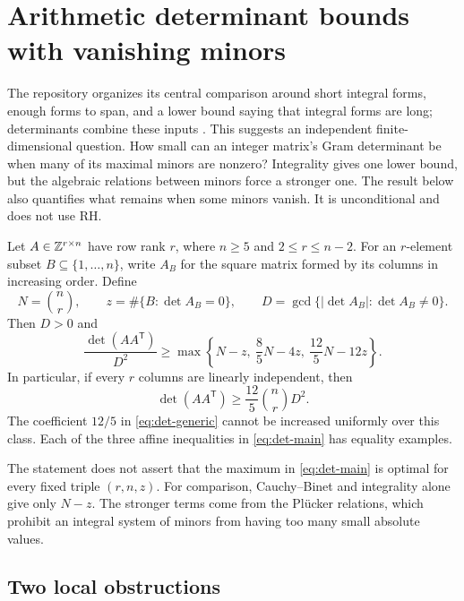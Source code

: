\section{Arithmetic determinant bounds with vanishing minors}
\label{sec:determinants}

The repository organizes its central comparison around short integral
forms, enough forms to span, and a lower bound saying that integral forms
are long; determinants combine these inputs
\cite{guide,mainineq}. This suggests an independent finite-dimensional
question. How small can an integer matrix's Gram determinant be when
many of its maximal minors are nonzero? Integrality gives one lower
bound, but the algebraic relations between minors force a stronger one.
The result below also quantifies what remains when some minors vanish.
It is unconditional and does not use RH.

\begin{theorem}
\label{thm:determinant}
Let $A\in\mathbb Z^{r\times n}$ have row rank $r$, where $n\ge5$ and
$2\le r\le n-2$. For an $r$-element subset $B\subseteq\{1,\ldots,n\}$,
write $A_B$ for the square matrix formed by its columns in increasing
order. Define
\[
 N=\binom nr,\qquad
 z=\#\{B:\det A_B=0\},\qquad
 D=\gcd\{\lvert\det A_B\rvert:\det A_B\ne0\}.
\]
Then $D>0$ and
\begin{equation}
\boxed{\quad
 \frac{\det(AA^{\mathsf T})}{D^2}
 \ge
 \max\left\{N-z,\ \frac85N-4z,\ \frac{12}5N-12z\right\}.
 \quad}
\label{eq:det-main}
\end{equation}
In particular, if every $r$ columns are linearly independent, then
\begin{equation}
 \det(AA^{\mathsf T})\ge\frac{12}{5}\binom nr D^2.
 \label{eq:det-generic}
\end{equation}
The coefficient $12/5$ in \eqref{eq:det-generic} cannot be increased
uniformly over this class. Each of the three affine inequalities in
\eqref{eq:det-main} has equality examples.
\end{theorem}

The statement does not assert that the maximum in
\eqref{eq:det-main} is optimal for every fixed triple $(r,n,z)$.
For comparison, Cauchy--Binet and integrality alone give only $N-z$.
The stronger terms come from the Pl\"ucker relations, which prohibit
an integral system of minors from having too many small absolute values.

\subsection{Two local obstructions}

